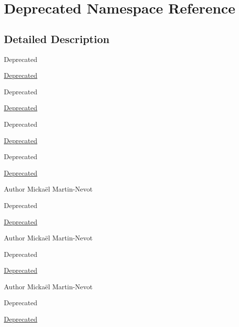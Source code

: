 \hypertarget{namespace_deprecated}{}\section{Deprecated Namespace Reference}
\label{namespace_deprecated}


\subsection{Detailed Description}
\begin{DoxyRefDesc}{Deprecated}
\item[\hyperlink{deprecated__deprecated000001}{Deprecated}]\end{DoxyRefDesc}


\begin{DoxyRefDesc}{Deprecated}
\item[\hyperlink{deprecated__deprecated000002}{Deprecated}]\end{DoxyRefDesc}


\begin{DoxyRefDesc}{Deprecated}
\item[\hyperlink{deprecated__deprecated000003}{Deprecated}]\end{DoxyRefDesc}


\begin{DoxyRefDesc}{Deprecated}
\item[\hyperlink{deprecated__deprecated000004}{Deprecated}]\end{DoxyRefDesc}


\begin{DoxyAuthor}{Author}
Mickaël Martin-\/\+Nevot 
\end{DoxyAuthor}
\begin{DoxyRefDesc}{Deprecated}
\item[\hyperlink{deprecated__deprecated000005}{Deprecated}]\end{DoxyRefDesc}


\begin{DoxyAuthor}{Author}
Mickaël Martin-\/\+Nevot 
\end{DoxyAuthor}
\begin{DoxyRefDesc}{Deprecated}
\item[\hyperlink{deprecated__deprecated000006}{Deprecated}]\end{DoxyRefDesc}


\begin{DoxyAuthor}{Author}
Mickaël Martin-\/\+Nevot 
\end{DoxyAuthor}
\begin{DoxyRefDesc}{Deprecated}
\item[\hyperlink{deprecated__deprecated000007}{Deprecated}]\end{DoxyRefDesc}


